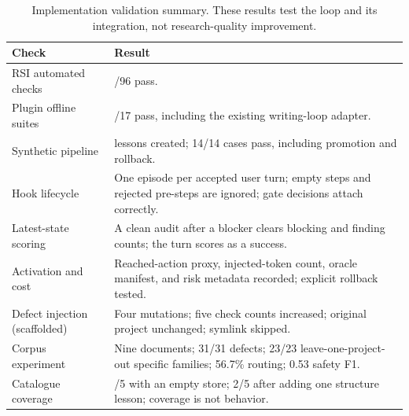 \begin{table}[t]
\centering
\small
\caption{Implementation validation summary. These results test the loop and its integration, not research-quality improvement.}
\label{tab:results}
\begin{tabularx}{\linewidth}{@{}l>{\raggedright\arraybackslash}X@{}}
\toprule
Check & Result \\
\midrule
RSI automated checks & 96/96 pass. \\
Plugin offline suites & 17/17 pass, including the existing writing-loop adapter. \\
Synthetic pipeline & 10 lessons created; 14/14 cases pass, including promotion and rollback. \\
Hook lifecycle & One episode per accepted user turn; empty steps and rejected pre-steps are ignored; gate decisions attach correctly. \\
Latest-state scoring & A clean audit after a blocker clears blocking and finding counts; the turn scores as a success. \\
Activation and cost & Reached-action proxy, injected-token count, oracle manifest, and risk metadata recorded; explicit rollback tested. \\
Defect injection (scaffolded) & Four mutations; five check counts increased; original project unchanged; symlink skipped. \\
Corpus experiment & Nine documents; 31/31 defects; 23/23 leave-one-project-out specific families; 56.7\% routing; 0.53 safety F1. \\
Catalogue coverage & 0/5 with an empty store; 2/5 after adding one structure lesson; coverage is not behavior. \\
\bottomrule
\end{tabularx}
\end{table}
